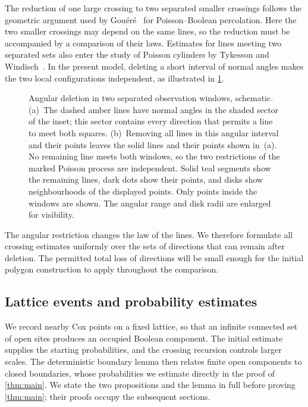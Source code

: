\documentclass[11pt,letterpaper]{article}
\begin{document}
The reduction of one large crossing to two separated smaller crossings follows the geometric argument used by Gou\'er\'e~\cite[Lemma~3.3]{Gou08} for Poisson--Boolean percolation. Here the two smaller crossings may depend on the same lines, so the reduction must be accompanied by a comparison of their laws. Estimates for lines meeting two separated sets also enter the study of Poisson cylinders by Tykesson and Windisch~\cite[Lemma~3.1]{TW12}. In the present model, deleting a short interval of normal angles makes the two local configurations independent, as illustrated in \cref{fig:deletion}.

\begin{figure}[ht]
  \centering
  
  \caption{Angular deletion in two separated observation windows, schematic. (a)~The dashed amber lines have normal angles in the shaded sector of the inset; this sector contains every direction that permits a line to meet both squares. (b)~Removing all lines in this angular interval and their points leaves the solid lines and their points shown in~(a). No remaining line meets both windows, so the two restrictions of the marked Poisson process are independent. Solid teal segments show the remaining lines, dark dots show their points, and disks show neighbourhoods of the displayed points. Only points inside the windows are shown. The angular range and disk radii are enlarged for visibility.}
  \label{fig:deletion}
\end{figure}

The angular restriction changes the law of the lines. We therefore formulate all crossing estimates uniformly over the sets of directions that can remain after deletion. The permitted total loss of directions will be small enough for the initial polygon construction to apply throughout the comparison.

\subsection{Lattice events and probability estimates}
\label{sec:lattice-events}

We record nearby Cox points on a fixed lattice, so that an infinite connected set of open sites produces an occupied Boolean component. The initial estimate supplies the starting probabilities, and the crossing recursion controls larger scales. The deterministic boundary lemma then relates finite open components to closed boundaries, whose probabilities we estimate directly in the proof of \cref{thm:main}. We state the two propositions and the lemma in full before proving \cref{thm:main}; their proofs occupy the subsequent sections.
\end{document}
